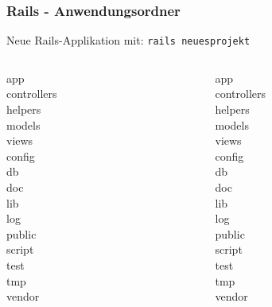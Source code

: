 \begin{frame}
  \frametitle{Rails - Anwendungsordner}
  \begin{center}
    Neue Rails-Applikation mit: {\tt rails neuesprojekt}
    \pause
    \small \tt
    \begin{columns}[t]
      \begin{column}{5cm}
        app \\
        \enskip controllers \\
        \enskip helpers \\
        \enskip models \\
        \enskip views \\
        config \\
        db \\
        doc \\
        lib \\
        log \\
        public \\
        script \\
        test \\
        tmp \\
        vendor
      \end{column}
      \pause
      \begin{column}{5cm}
        app \\
        \enskip controllers \\
        \enskip helpers \\
        \enskip models \\
        \enskip views \\
        config \\
        {\color{gray}db} \\
        {\color{lightgray}doc} \\
        {\color{lightgray}lib} \\
        {\color{gray}log} \\
        public \\
        script \\
        {\color{lightgray}test} \\
        {\color{lightgray}tmp} \\
        {\color{lightgray}vendor}
      \end{column}
    \end{columns}
  \end{center}
\end{frame}

